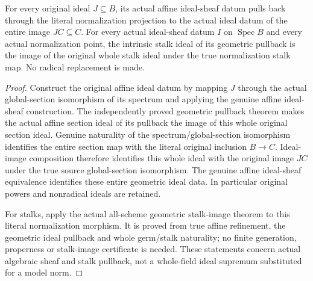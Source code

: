 \begin{theorem}
\label{scheme:normalization-original-ideal-pullback}
\leanok
{}
For every original ideal $J\subseteq B$, its actual affine ideal-sheaf
datum pulls back through the literal normalization projection to the
actual ideal datum of the entire image $JC\subseteq C$. For every
actual ideal-sheaf datum $I$ on $\operatorname{Spec}B$ and every actual
normalization point, the intrinsic stalk ideal of its geometric
pullback is the image of the original whole stalk ideal under the
true normalization stalk map. No radical replacement is made.
\end{theorem}
\begin{proof}
Construct the original affine ideal datum by mapping $J$ through the
actual global-section isomorphism of its spectrum and applying the
genuine affine ideal-sheaf construction. The independently proved
geometric pullback theorem makes the actual affine section ideal of
its pullback the image of this whole original section ideal. Genuine
naturality of the spectrum/global-section isomorphism identifies the
entire section map with the literal original inclusion $B\to C$.
Ideal-image composition therefore identifies this whole ideal with
the original image $JC$ under the true source global-section
isomorphism. The genuine affine ideal-sheaf equivalence identifies
these entire geometric ideal data. In particular original powers and
nonradical ideals are retained.

For stalks, apply the actual all-scheme geometric stalk-image theorem
to this literal normalization morphism. It is proved from true affine
refinement, the geometric ideal pullback and whole germ/stalk
naturality; no finite generation, properness or stalk-image certificate
is needed. These statements concern actual algebraic sheaf and stalk
pullback, not a whole-field ideal supremum substituted for a model norm.
\end{proof}

